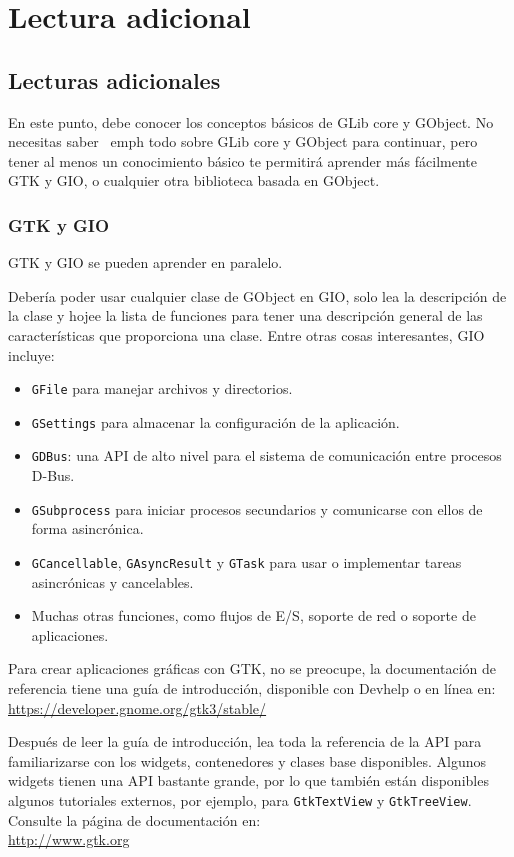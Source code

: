 \part{Lectura adicional \label{further-reading}}

\chapter{Lecturas adicionales}

En este punto, debe conocer los conceptos básicos de GLib core y GObject. No necesitas saber \ emph {todo} sobre GLib core y GObject para continuar, pero tener al menos un conocimiento básico te permitirá aprender más fácilmente GTK y GIO, o cualquier otra biblioteca basada en GObject.

\section{GTK y GIO}
GTK y GIO se pueden aprender en paralelo.

Debería poder usar cualquier clase de GObject en GIO, solo lea la descripción de la clase y hojee la lista de funciones para tener una descripción general de las características que proporciona una clase. Entre otras cosas interesantes, GIO incluye:
\begin{itemize}
  \item \lstinline{GFile} para manejar archivos y directorios.
  \item \lstinline{GSettings} para almacenar la configuración de la aplicación.
  \item \lstinline{GDBus}: una API de alto nivel para el sistema de comunicación entre procesos D-Bus.
  \item \lstinline{GSubprocess} para iniciar procesos secundarios y comunicarse con ellos de forma asincrónica.
  \item \lstinline{GCancellable}, \lstinline{GAsyncResult} y \lstinline{GTask} para usar o implementar tareas asincrónicas y cancelables.
  \item Muchas otras funciones, como flujos de E/S, soporte de red o soporte de aplicaciones.
\end{itemize}

Para crear aplicaciones gráficas con GTK, no se preocupe, la documentación de referencia tiene una guía de introducción, disponible con Devhelp o en línea en: \\
\url{https://developer.gnome.org/gtk3/stable/}

Después de leer la guía de introducción, lea toda la referencia de la API para familiarizarse con los widgets, contenedores y clases base disponibles. Algunos widgets tienen una API bastante grande, por lo que también están disponibles algunos tutoriales externos, por ejemplo, para \lstinline{GtkTextView} y \lstinline{GtkTreeView}. Consulte la página de documentación en: \\
\url{http://www.gtk.org}

